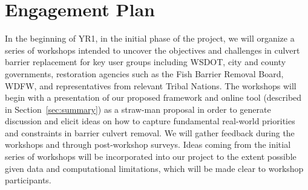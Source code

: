 \documentclass[12pt]{elsarticle}
\begin{document}

\section{Engagement Plan}\label{sec:engage} %

In the beginning of YR1, in the initial phase of the project, we will organize a series of workshops intended to uncover the objectives and challenges in culvert barrier replacement for key user groups including WSDOT, city and county governments, restoration agencies such as the Fish Barrier Removal Board, WDFW, and representatives from relevant Tribal Nations. The workshops will begin with a presentation of our proposed framework and online tool (described in Section~\ref{sec:summary}) as a straw-man proposal in order to generate discussion and elicit ideas on how to capture fundamental real-world priorities and constraints in barrier culvert removal. We will gather feedback during the workshops and through post-workshop surveys. Ideas coming from the initial series of workshops will be incorporated into our project to the extent possible given data and computational limitations, which will be made clear to workshop participants.
\end{document}
